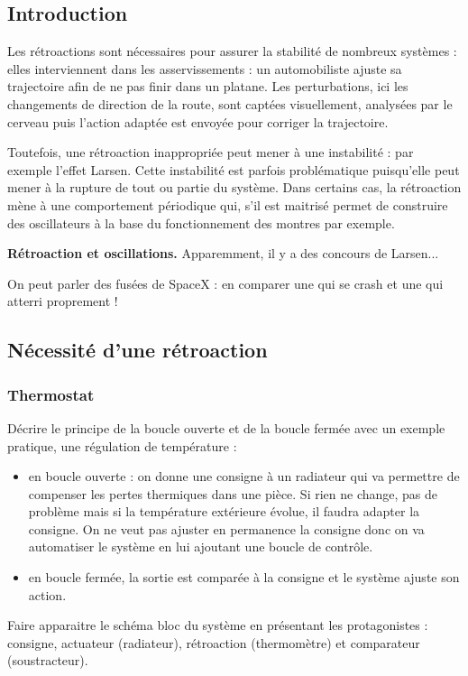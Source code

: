 \subsection*{Introduction}

Les rétroactions sont nécessaires pour assurer la stabilité de nombreux systèmes : elles interviennent dans les asservissements : un automobiliste ajuste sa trajectoire afin de ne pas finir dans un platane.
Les perturbations, ici les changements de direction de la route, sont captées visuellement, analysées par le cerveau puis l'action adaptée est envoyée pour corriger la trajectoire.

Toutefois, une rétroaction inappropriée peut mener à une instabilité : par exemple l'effet Larsen.
Cette instabilité est parfois problématique puisqu'elle peut mener à la rupture de tout ou partie du système.
Dans certains cas, la rétroaction mène à une comportement périodique qui, s'il est maitrisé permet de construire des oscillateurs à la base du fonctionnement des montres par exemple.

\begin{slide}
\textbf{Rétroaction et oscillations.}
Apparemment, il y a des concours de Larsen...
\end{slide}

On peut parler des fusées de SpaceX : en comparer une qui se crash et une qui atterri proprement ! 

\subsection{Nécessité d'une rétroaction}

\subsubsection{Thermostat}

Décrire le principe de la boucle ouverte et de la boucle fermée avec un exemple pratique, une régulation de température :
\begin{itemize}
\item en boucle ouverte : on donne une consigne à un radiateur qui va permettre de compenser les pertes thermiques dans une pièce.
Si rien ne change, pas de problème mais si la température extérieure évolue, il faudra adapter la consigne.
On ne veut pas ajuster en permanence la consigne donc on va automatiser le système en lui ajoutant une boucle de contrôle.
\item en boucle fermée, la sortie est comparée à la consigne et le système ajuste son action.
\end{itemize}
Faire apparaitre le schéma bloc du système en présentant les protagonistes : consigne, actuateur (radiateur), rétroaction (thermomètre) et comparateur (soustracteur).

